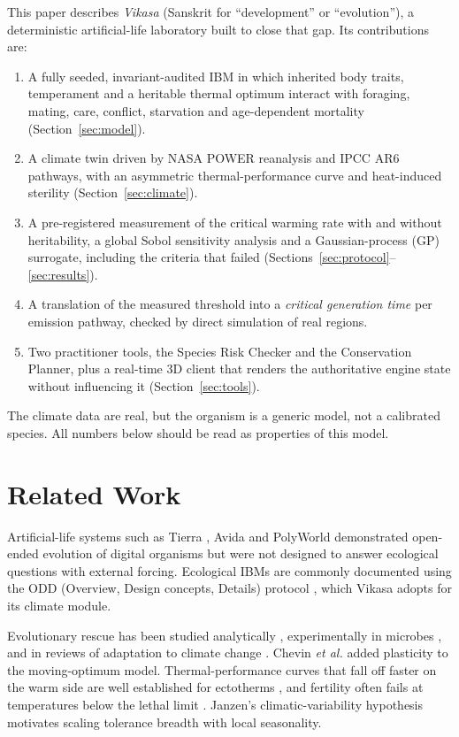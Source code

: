 \documentclass[conference]{IEEEtran}
\begin{document}
This paper describes \emph{Vikasa} (Sanskrit for ``development'' or ``evolution''),
a deterministic artificial-life laboratory built to close that gap. Its
contributions are:
\begin{enumerate}
\item A fully seeded, invariant-audited IBM in which inherited body traits,
temperament and a heritable thermal optimum interact with foraging, mating, care,
conflict, starvation and age-dependent mortality (Section~\ref{sec:model}).
\item A climate twin driven by NASA POWER reanalysis and IPCC AR6 pathways, with
an asymmetric thermal-performance curve and heat-induced sterility
(Section~\ref{sec:climate}).
\item A pre-registered measurement of the critical warming rate with and without
heritability, a global Sobol sensitivity analysis and a Gaussian-process (GP)
surrogate, including the criteria that failed (Sections~\ref{sec:protocol}--\ref{sec:results}).
\item A translation of the measured threshold into a \emph{critical generation
time} per emission pathway, checked by direct simulation of real regions.
\item Two practitioner tools, the Species Risk Checker and the Conservation
Planner, plus a real-time 3D client that renders the authoritative engine state
without influencing it (Section~\ref{sec:tools}).
\end{enumerate}

The climate data are real, but the organism is a generic model, not a calibrated
species. All numbers below should be read as properties of this model.

\section{Related Work}
Artificial-life systems such as Tierra \cite{ray1991}, Avida \cite{ofria2004} and
PolyWorld \cite{yaeger1994} demonstrated open-ended evolution of digital organisms
but were not designed to answer ecological questions with external forcing.
Ecological IBMs \cite{deangelis2014} are commonly documented using the ODD
(Overview, Design concepts, Details) protocol \cite{grimm2006,grimm2020}, which
Vikasa adopts for its climate module.

Evolutionary rescue has been studied analytically \cite{gomulkiewicz1995,lynch1993,burger1995},
experimentally in microbes \cite{bell2009}, and in reviews of adaptation to
climate change \cite{hoffmann2011}. Chevin \emph{et al.} \cite{chevin2010} added
plasticity to the moving-optimum model. Thermal-performance curves that fall off
faster on the warm side are well established for ectotherms
\cite{huey1989,deutsch2008}, and fertility often fails at temperatures below the
lethal limit \cite{walsh2019}. Janzen's climatic-variability hypothesis
\cite{janzen1967} motivates scaling tolerance breadth with local seasonality.
\end{document}
